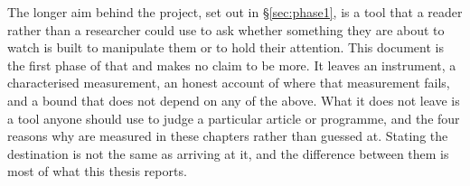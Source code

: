 The longer aim behind the project, set out in \S\ref{sec:phase1}, is a tool that a reader
rather than a researcher could use to ask whether something they are about to watch is built
to manipulate them or to hold their attention. This document is the first phase of that and
makes no claim to be more. It leaves an instrument, a characterised measurement, an honest
account of where that measurement fails, and a bound that does not depend on any of the
above. What it does not leave is a tool anyone should use to judge a particular article or
programme, and the four reasons why are measured in these chapters rather than guessed at.
Stating the destination is not the same as arriving at it, and the difference between them is
most of what this thesis reports.
